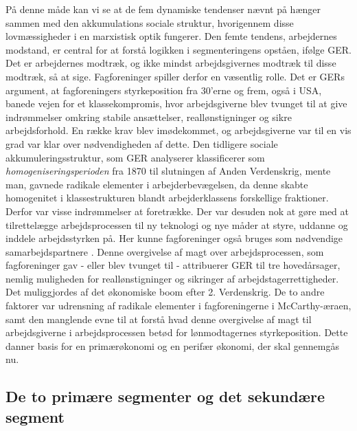 På denne måde kan vi se at de fem dynamiske tendenser nævnt på  hænger sammen med den akkumulations sociale struktur, hvorigennem disse lovmæssigheder i en marxistisk optik fungerer. Den femte tendens, arbejdernes modstand, er central for at forstå logikken i segmenteringens opståen, ifølge GER. Det er arbejdernes modtræk, og ikke mindst arbejdsgivernes modtræk til disse modtræk, så at sige. 
Fagforeninger spiller derfor en væsentlig rolle. Det er GERs argument, at fagforeningers styrkeposition fra 30'erne og frem, også i USA, banede vejen for et klassekompromis, hvor arbejdsgiverne blev tvunget til at give indrømmelser omkring stabile ansættelser, reallønstigninger og sikre arbejdsforhold. En række krav blev imødekommet, og arbejdsgiverne var til en vis grad var klar over nødvendigheden af dette. Den tidligere sociale akkumuleringsstruktur, som GER analyserer klassificerer som \emph{homogeniseringsperioden} fra 1870 til slutningen af Anden Verdenskrig, mente man, gavnede radikale elementer i arbejderbevægelsen, da denne skabte homogenitet i klassestrukturen blandt arbejderklassens forskellige fraktioner. Derfor var visse indrømmelser at foretrække. Der var desuden nok at gøre med at tilrettelægge arbejdsprocessen til ny teknologi og nye måder at styre, uddanne og inddele arbejdsstyrken på. Her kunne fagforeninger også bruges som nødvendige samarbejdspartnere \parencite[186f]{Gordon1982}. Denne overgivelse af magt over arbejdsprocessen, som fagforeninger gav - eller blev tvunget til - attribuerer GER til tre hovedårsager, nemlig muligheden for reallønstigninger og sikringer af arbejdstagerrettigheder. Det  muliggjordes af det økonomiske boom efter 2. Verdenskrig. De to andre faktorer var udrensning af radikale elementer i fagforeningerne i McCarthy-æraen, samt den manglende evne til at forstå hvad denne overgivelse af magt til arbejdsgiverne i arbejdsprocessen betød for lønmodtagernes styrkeposition. Dette danner basis for en primærøkonomi og en perifær økonomi, der skal gennemgås nu.

\subsection{De to primære segmenter og det sekundære segment \label{AST_primuafprimundersekundaer}}


